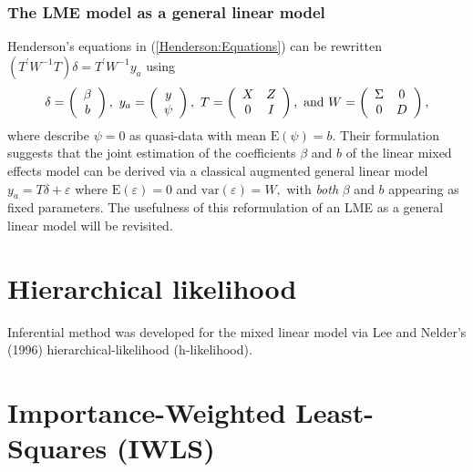\documentclass[Chap5dmain.tex]{subfiles}
\begin{document}




\subsubsection{The LME model as a general linear model}
Henderson's equations in (\ref{Henderson:Equations}) can be rewritten $( T^\prime W^{-1} T ) \delta = T^\prime W^{-1} y_{a} $ using
\[
\delta = \left(\begin{array}{c}\beta \\ b \end{array}\right),
\ y_{a} = \left(\begin{array}{c}
y \cr \psi
\end{array}\right),
\ T = \left(\begin{array}{cc}
X & Z  \\
0 & I
\end{array}\right),
\ \textrm{and} \ W = \left(\begin{array}{cc}
\Sigma & 0  \cr
0 &  D \end{array}\right),
\]
where \cite{Lee:Neld:Pawi:2006} describe $\psi = 0$ as quasi-data with mean $\mathrm{E}(\psi) = b.$ Their formulation suggests that the joint estimation of the coefficients $\beta$ and $b$ of the linear mixed effects model can be derived via a classical augmented general linear model $y_{a} = T\delta + \varepsilon$ where $\mathrm{E}(\varepsilon) = 0$ and $\mathrm{var}(\varepsilon) = W,$ with \emph{both} $\beta$ and $b$ appearing as fixed parameters. The usefulness of this reformulation of an LME as a general linear model will be revisited.


\newpage                                                                    %


\section{Hierarchical likelihood} %
Inferential method was developed for the mixed linear model via Lee and Nelder's (1996) hierarchical-likelihood (h-likelihood).

\section{Importance-Weighted Least-Squares (IWLS)}  %
\end{document}
